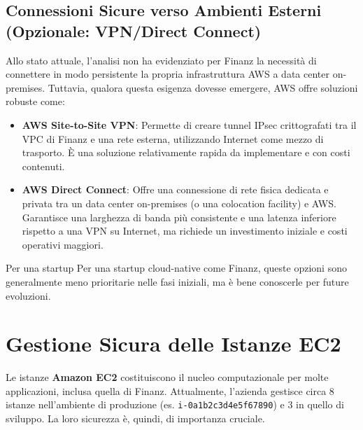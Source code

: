 \subsection{Connessioni Sicure verso Ambienti Esterni (Opzionale: VPN/Direct Connect)}
\label{subsec:vpn-directconnect_cap2}
Allo stato attuale, l'analisi non ha evidenziato per Finanz la necessità di connettere in modo persistente la propria infrastruttura AWS a data center on-premises. Tuttavia, qualora questa esigenza dovesse emergere, AWS offre soluzioni robuste come:
\begin{itemize}
    \item \textbf{AWS Site-to-Site VPN}: Permette di creare tunnel IPsec crittografati tra il VPC di Finanz e una rete esterna, utilizzando Internet come mezzo di trasporto. È una soluzione relativamente rapida da implementare e con costi contenuti.
    \item \textbf{AWS Direct Connect}: Offre una connessione di rete fisica dedicata e privata tra un data center on-premises (o una colocation facility) e AWS. Garantisce una larghezza di banda più consistente e una latenza inferiore rispetto a una VPN su Internet, ma richiede un investimento iniziale e costi operativi maggiori.
\end{itemize}
Per una startup Per una startup cloud-native come Finanz, queste opzioni sono generalmente meno prioritarie nelle fasi iniziali, ma è bene conoscerle per future evoluzioni.

\section{Gestione Sicura delle Istanze EC2}
\label{sec:ec2-security_cap2}
Le istanze \textbf{Amazon EC2} costituiscono il nucleo computazionale per molte applicazioni, inclusa quella di Finanz. Attualmente, l'azienda gestisce circa 8 istanze nell'ambiente di produzione (es. \texttt{i-0a1b2c3d4e5f67890}) e 3 in quello di sviluppo. La loro sicurezza è, quindi, di importanza cruciale.

